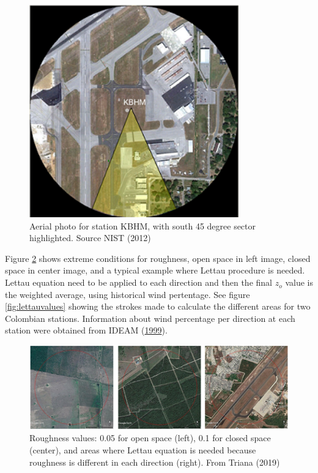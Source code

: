 \documentclass[12pt,oneside]{reedthesis}
\begin{document}
\footnotesize
\begin{figure}

{\centering \includegraphics[width=3.56in]{figure/aerial_photo_pintar} 

}

\caption{Aerial photo for station KBHM, with south 45 degree sector highlighted. Source NIST (2012)}\label{fig:lettaustation}
\end{figure}
\normalsize

Figure \ref{fig:lettauexamples} shows extreme conditions for roughness, open space in left image, closed space in center image, and a typical example where Lettau procedure is needed. Lettau equation need to be applied to each direction and then the final \(z_o\) value is the weighted average, using historical wind pertentage. See figure \ref{fig:lettauvalues} showing the strokes made to calculate the different areas for two Colombian stations. Information about wind percentage per direction at each station were obtained from IDEAM (\protect\hyperlink{ref-ideam1999}{1999}).

\footnotesize
\begin{figure}

{\centering \includegraphics[width=6.15in]{figure/lettauexamples} 

}

\caption{Roughness values: 0.05 for open space (left), 0.1 for closed space (center), and areas where Lettau equation is needed because roughness is different in each direction (right). From Triana (2019)}\label{fig:lettauexamples}
\end{figure}
\normalsize
\end{document}
